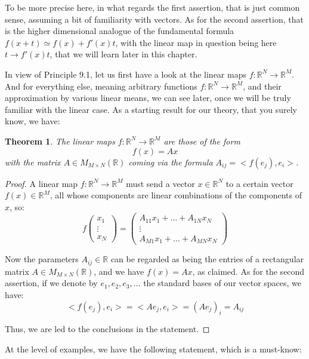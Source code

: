 \documentclass[12pt]{amsbook}
\newtheorem{theorem}{Theorem}[chapter]
\begin{document}
To be more precise here, in what regards the first assertion, that is just common sense, assuming a bit of familiarity with vectors. As for the second assertion, that is the higher dimensional analogue of the fundamental formula $f(x+t)\simeq f(x)+f'(x)t$, with the linear map in question being here $t\to f'(x)t$, that we will learn later in this chapter.

\bigskip

In view of Principle 9.1, let us first have a look at the linear maps $f:\mathbb R^N\to\mathbb R^M$. And for everything else, meaning arbitrary functions $f:\mathbb R^N\to\mathbb R^M$, and their approximation by various linear means, we can see later, once we will be truly familiar with the linear case. As a starting result for our theory, that you surely know, we have:


\begin{theorem}
The linear maps $f:\mathbb R^N\to\mathbb R^M$ are those of the form
$$f(x)=Ax$$
with the matrix $A\in M_{M\times N}(\mathbb R)$ coming via the formula $A_{ij}=<f(e_j),e_i>$.
\end{theorem}

\begin{proof}
A linear map $f:\mathbb R^N\to\mathbb R^M$ must send a vector $x\in\mathbb R^N$ to a certain vector $f(x)\in\mathbb R^M$, all whose components are linear combinations of the components of $x$, so:
$$f\begin{pmatrix}
x_1\\
\vdots\\
x_N
\end{pmatrix}
=\begin{pmatrix}
A_{11}x_1+\ldots+A_{1N}x_N\\
\vdots\\
A_{M1}x_1+\ldots+A_{MN}x_N
\end{pmatrix}$$

Now the parameters $A_{ij}\in\mathbb R$ can be regarded as being the entries of a rectangular matrix $A\in M_{M\times N}(\mathbb R)$, and we have $f(x)=Ax$, as claimed. As for the second assertion, if we denote by $e_1,e_2,e_3,\ldots$ the standard bases of our vector spaces, we have:
$$<f(e_j),e_i>
=<Ae_j,e_i>
=(Ae_j)_i
=A_{ij}$$

Thus, we are led to the conclusions in the statement.
\end{proof}

At the level of examples, we have the following statement, which is a must-know:
\end{document}
